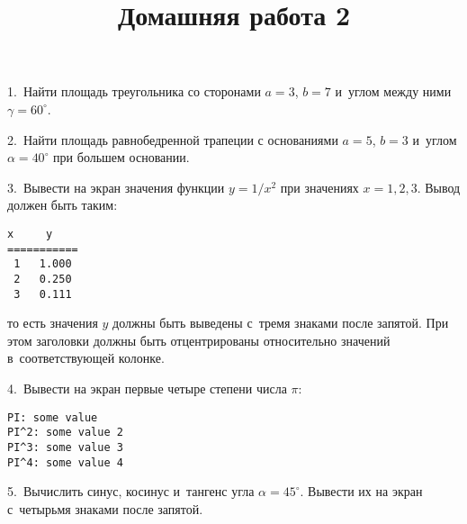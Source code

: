 \documentclass[12pt,russian,draft]{article}
\title{Домашняя работа 2}
\date{}
\begin{document}
\maketitle{}

1.\ Найти площадь треугольника со сторонами $ a = 3 $, $ b = 7 $ и~углом между
ними $ \gamma = 60^{\circ} $.

2.\ Найти площадь равнобедренной трапеции с основаниями $ a = 5 $, $ b = 3 $
и~углом $ \alpha = 40^{\circ} $ при большем основании.

3.\ Вывести на экран значения функции $ y = 1 / x^2 $ при значениях $ x = 1, 2,
3 $. Вывод должен быть таким:
\begin{Verbatim}[fontfamily=tt]
 x     y   
===========
 1   1.000 
 2   0.250 
 3   0.111 
\end{Verbatim}
то есть значения $ y $ должны быть выведены с~тремя знаками после запятой. При
этом заголовки должны быть отцентрированы относительно значений 
в~соответствующей колонке.

4.\ Вывести на экран первые четыре степени числа $ \pi $:
\begin{Verbatim}[fontfamily=tt]
PI: some value
PI^2: some value 2
PI^3: some value 3
PI^4: some value 4
\end{Verbatim}

5.\ Вычислить синус, косинус и~тангенс угла $ \alpha = 45^{\circ} $. Вывести их
на экран с~четырьмя знаками после запятой.
\end{document}
